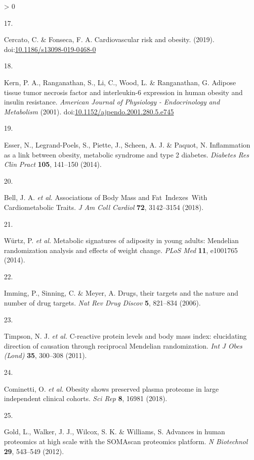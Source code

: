 \documentclass[11pt,twoside]{bristolthesis}
\newlength{\cslhangindent}
\newlength{\csllabelwidth}
\newenvironment{CSLReferences}[2] %
 {%
  \setlength{\parindent}{0pt}
  \ifodd #1 \everypar{\setlength{\hangindent}{\cslhangindent}}\ignorespaces\fi
  \ifnum #2 > 0
  \setlength{\parskip}{#2\baselineskip}
  \fi
 }%
 {}
\newcommand{\CSLLeftMargin}[1]{\parbox[t]{\csllabelwidth}{#1}}
\newcommand{\CSLRightInline}[1]{\parbox[t]{\linewidth - \csllabelwidth}{#1}\break}
\begin{document}
\begin{CSLReferences}{0}{0}
\leavevmode\hypertarget{ref-Cercato2019}{}%
\CSLLeftMargin{17. }
\CSLRightInline{Cercato, C. \& Fonseca, F. A. {Cardiovascular risk and obesity}. (2019). doi:\href{https://doi.org/10.1186/s13098-019-0468-0}{10.1186/s13098-019-0468-0}}

\leavevmode\hypertarget{ref-Kern2001}{}%
\CSLLeftMargin{18. }
\CSLRightInline{Kern, P. A., Ranganathan, S., Li, C., Wood, L. \& Ranganathan, G. {Adipose tissue tumor necrosis factor and interleukin-6 expression in human obesity and insulin resistance}. \emph{American Journal of Physiology - Endocrinology and Metabolism} (2001). doi:\href{https://doi.org/10.1152/ajpendo.2001.280.5.e745}{10.1152/ajpendo.2001.280.5.e745}}

\leavevmode\hypertarget{ref-Esser2014}{}%
\CSLLeftMargin{19. }
\CSLRightInline{Esser, N., Legrand-Poels, S., Piette, J., Scheen, A. J. \& Paquot, N. {Inflammation as a link between obesity, metabolic syndrome and type 2 diabetes}. \emph{Diabetes Res Clin Pract} \textbf{105}, 141--150 (2014).}

\leavevmode\hypertarget{ref-Bell2018a}{}%
\CSLLeftMargin{20. }
\CSLRightInline{Bell, J. A. \emph{et al.} {Associations of Body Mass and Fat~Indexes~With Cardiometabolic Traits}. \emph{J Am Coll Cardiol} \textbf{72}, 3142--3154 (2018).}

\leavevmode\hypertarget{ref-Wurtz2014}{}%
\CSLLeftMargin{21. }
\CSLRightInline{Würtz, P. \emph{et al.} {Metabolic signatures of adiposity in young adults: Mendelian randomization analysis and effects of weight change}. \emph{PLoS Med} \textbf{11}, e1001765 (2014).}

\leavevmode\hypertarget{ref-Imming2006}{}%
\CSLLeftMargin{22. }
\CSLRightInline{Imming, P., Sinning, C. \& Meyer, A. {Drugs, their targets and the nature and number of drug targets}. \emph{Nat Rev Drug Discov} \textbf{5}, 821--834 (2006).}

\leavevmode\hypertarget{ref-Timpson2011}{}%
\CSLLeftMargin{23. }
\CSLRightInline{Timpson, N. J. \emph{et al.} {C-reactive protein levels and body mass index: elucidating direction of causation through reciprocal Mendelian randomization}. \emph{Int J Obes (Lond)} \textbf{35}, 300--308 (2011).}

\leavevmode\hypertarget{ref-Cominetti2018}{}%
\CSLLeftMargin{24. }
\CSLRightInline{Cominetti, O. \emph{et al.} {Obesity shows preserved plasma proteome in large independent clinical cohorts}. \emph{Sci Rep} \textbf{8}, 16981 (2018).}

\leavevmode\hypertarget{ref-Gold2012}{}%
\CSLLeftMargin{25. }
\CSLRightInline{Gold, L., Walker, J. J., Wilcox, S. K. \& Williams, S. {Advances in human proteomics at high scale with the SOMAscan proteomics platform}. \emph{N Biotechnol} \textbf{29}, 543--549 (2012).}


\end{CSLReferences}
\end{document}
